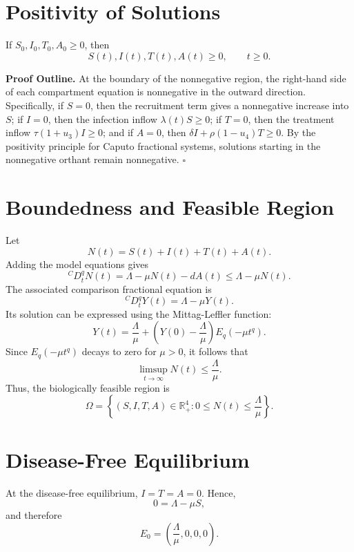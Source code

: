 \documentclass[12pt,a4paper,oneside]{report}
\newcommand{\R}{\mathbb{R}}
\newcommand{\CaputoD}[2]{{}^{C}D_{#1}^{#2}}
\begin{document}
\section{Positivity of Solutions}
\begin{resultbox}[title={Positivity}]
If $S_0,I_0,T_0,A_0\geq0$, then
\[
S(t), I(t), T(t), A(t)\geq0, \qquad t\geq0.
\]
\end{resultbox}

\noindent\textbf{Proof Outline.}
At the boundary of the nonnegative region, the right-hand side of each compartment equation is nonnegative in the outward direction. Specifically, if $S=0$, then the recruitment term gives a nonnegative increase into $S$; if $I=0$, then the infection inflow $\lambda(t)S\geq0$; if $T=0$, then the treatment inflow $\tau(1+u_3)I\geq0$; and if $A=0$, then $\delta I+\rho(1-u_4)T\geq0$. By the positivity principle for Caputo fractional systems, solutions starting in the nonnegative orthant remain nonnegative. \hfill$\square$

\section{Boundedness and Feasible Region}
Let
\[
N(t)=S(t)+I(t)+T(t)+A(t).
\]
Adding the model equations gives
\begin{equation}
\CaputoD{t}{q}N(t)=\Lambda-\mu N(t)-dA(t)\leq \Lambda-\mu N(t).
\end{equation}
The associated comparison fractional equation is
\[
\CaputoD{t}{q}Y(t)=\Lambda-\mu Y(t).
\]
Its solution can be expressed using the Mittag-Leffler function:
\[
Y(t)=\frac{\Lambda}{\mu}+\left(Y(0)-\frac{\Lambda}{\mu}\right)E_q(-\mu t^q).
\]
Since $E_q(-\mu t^q)$ decays to zero for $\mu>0$, it follows that
\[
\limsup_{t\to\infty}N(t)\leq\frac{\Lambda}{\mu}.
\]
Thus, the biologically feasible region is
\begin{equation}
\Omega=\left\{(S,I,T,A)\in\R_+^4: 0\leq N(t)\leq \frac{\Lambda}{\mu}\right\}.
\end{equation}

\section{Disease-Free Equilibrium}
At the disease-free equilibrium, $I=T=A=0$. Hence,
\[
0=\Lambda-\mu S,
\]
and therefore
\begin{equation}
E_0=\left(\frac{\Lambda}{\mu},0,0,0\right).
\end{equation}
\end{document}
